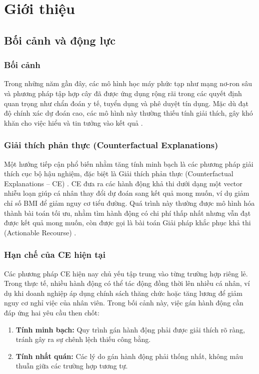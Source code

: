 \chapter{Giới thiệu}

\section{Bối cảnh và động lực}

\subsection{Bối cảnh}
Trong những năm gần đây, các mô hình học máy phức tạp như mạng nơ-ron sâu và phương pháp tập hợp cây đã được ứng dụng rộng rãi trong các quyết định quan trọng như chẩn đoán y tế, tuyển dụng và phê duyệt tín dụng. Mặc dù đạt độ chính xác dự đoán cao, các mô hình này thường thiếu tính giải thích, gây khó khăn cho việc hiểu và tin tưởng vào kết quả \parencite{doshivelez2017rigorousscienceinterpretablemachine}.

\subsection{Giải thích phản thực (Counterfactual Explanations)}
Một hướng tiếp cận phổ biến nhằm tăng tính minh bạch là các phương pháp giải thích cục bộ hậu nghiệm, đặc biệt là Giải thích phản thực (Counterfactual Explanations – CE) \parencite{wachter2018counterfactualexplanationsopeningblack}. CE đưa ra các hành động khả thi dưới dạng một vector nhiễu loạn giúp cá nhân thay đổi dự đoán sang kết quả mong muốn, ví dụ giảm chỉ số BMI để giảm nguy cơ tiểu đường. Quá trình này thường được mô hình hóa thành bài toán tối ưu, nhằm tìm hành động có chi phí thấp nhất nhưng vẫn đạt được kết quả mong muốn, còn được gọi là bài toán Giải pháp khắc phục khả thi (Actionable Recourse) \parencite{Ustun_2019}.

\subsection{Hạn chế của CE hiện tại}
Các phương pháp CE hiện nay chủ yếu tập trung vào từng trường hợp riêng lẻ. Trong thực tế, nhiều hành động có thể tác động đồng thời lên nhiều cá nhân, ví dụ khi doanh nghiệp áp dụng chính sách thăng chức hoặc tăng lương để giảm nguy cơ nghỉ việc của nhân viên. Trong bối cảnh này, việc gán hành động cần đáp ứng hai yêu cầu then chốt:

\begin{enumerate}
\item \textbf{Tính minh bạch:} Quy trình gán hành động phải được giải thích rõ ràng, tránh gây ra sự chênh lệch thiếu công bằng.
\item \textbf{Tính nhất quán:} Các lý do gán hành động phải thống nhất, không mâu thuẫn giữa các trường hợp tương tự.
\end{enumerate}

